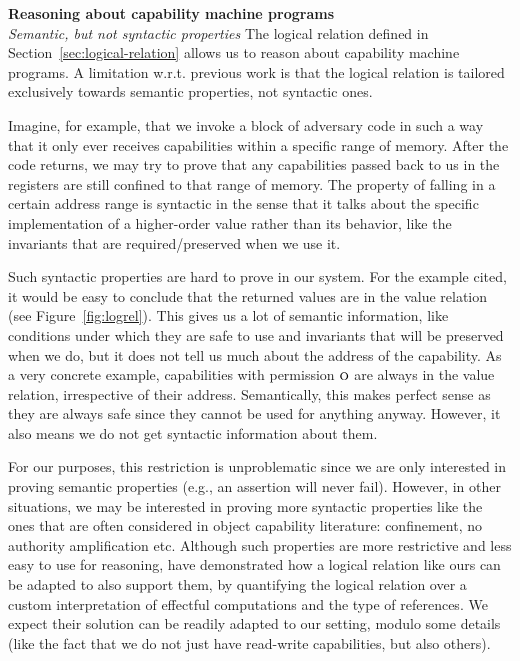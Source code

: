 \documentclass[format=acmsmall, review=true, screen=true]{acmart}
\renewcommand{\figurename}{Figure}
\renewcommand{\sectionname}{Section}
\newcommand{\plainperm}[1]{\textsc{#1}}
\newcommand{\noperm}{\plainperm{o}}
\newenvironment{toplas}%
    {\color{OliveGreen}}{}
\begin{document}
\begin{toplas}
\noindent \textbf{Reasoning about capability machine programs}\\
\emph{Semantic, but not syntactic properties} The logical relation defined in
\sectionname~\ref{sec:logical-relation} allows us to reason about capability machine
programs. A limitation w.r.t. previous work is that the logical relation is
tailored exclusively towards semantic properties, not syntactic ones.

Imagine, for example, that we invoke a block of adversary code in such a way
that it only ever receives capabilities within a specific range of memory. After
the code returns, we may try to prove that any capabilities passed back to us in
the registers are still confined to that range of memory. The property of
falling in a certain address range is syntactic in the sense that it talks about
the specific implementation of a higher-order value rather than its behavior,
like the invariants that are required/preserved when we use it.

Such syntactic properties are hard to prove in our system. For the example
cited, it would be easy to conclude that the returned values are in the value
relation (see \figurename~\ref{fig:logrel}). This gives us a lot of semantic
information, like conditions under which they are safe to use and invariants
that will be preserved when we do, but it does not tell us much about the
address of the capability. As a very concrete example, capabilities with
permission $\noperm$ are always in the value relation, irrespective of their
address. Semantically, this makes perfect sense as they are always safe
since they cannot be used for anything anyway. However, it also means we do not
get syntactic information about them.

For our purposes, this restriction is unproblematic since we are only
interested in proving semantic properties (e.g., an assertion will never fail).
However, in other situations, we may be interested in proving more syntactic
properties like the ones that are often considered in object capability
literature: confinement, no authority amplification etc. Although such
properties are more restrictive and less easy to use for reasoning,
\citet{Devriese:2016ObjCap} have demonstrated how a logical relation like
ours can be adapted to also support them, by quantifying the logical relation
over a custom interpretation of effectful computations and the type of
references. We expect their solution can be readily adapted to our setting,
modulo some details (like the fact that we do not just have read-write
capabilities, but also others).
\end{toplas}
\end{document}
